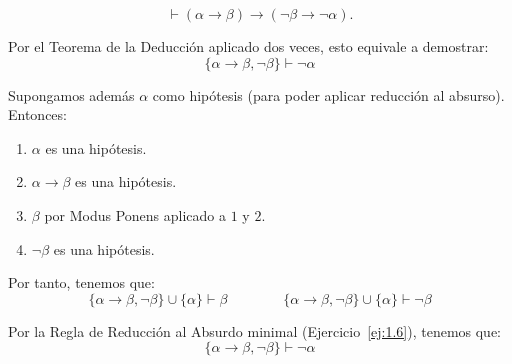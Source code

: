 \begin{ejercicio}\label{ej:1.14}
    $$\vdash (\alpha \rightarrow \beta) \rightarrow (\neg\beta \rightarrow \neg\alpha).$$
    
    Por el Teorema de la Deducción aplicado dos veces, esto equivale a demostrar:
    \begin{equation*}
        \{\alpha\rightarrow\beta,\neg\beta\} \vdash \neg\alpha
    \end{equation*}

    Supongamos además $\alpha$ como hipótesis (para poder aplicar reducción al absurso). Entonces:
    \begin{enumerate}
        \item $\alpha$ es una hipótesis.
        \item $\alpha\rightarrow \beta$ es una hipótesis.
        \item $\beta$ por Modus Ponens aplicado a $1$ y $2$.
        \item $\neg\beta$ es una hipótesis.
    \end{enumerate}

    Por tanto, tenemos que:
    \begin{equation*}
        \{\alpha\rightarrow\beta,\neg\beta\}\cup \{\alpha\} \vdash \beta\qquad\qquad\{\alpha\rightarrow\beta,\neg\beta\}\cup \{\alpha\} \vdash \neg\beta
    \end{equation*}

    Por la Regla de Reducción al Absurdo minimal (Ejercicio~\ref{ej:1.6}), tenemos que:
    \begin{equation*}
        \{\alpha\rightarrow\beta,\neg\beta\} \vdash \neg\alpha
    \end{equation*}
\end{ejercicio}

